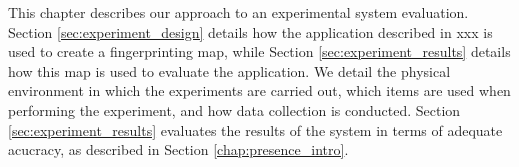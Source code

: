 This chapter describes our approach to an experimental system evaluation.
Section \ref{sec:experiment_design} details how the application described in xxx is used to create a fingerprinting map, while Section \ref{sec:experiment_results} details how this map is used to evaluate the application.
We detail the physical environment in which the experiments are carried out, which items are used when performing the experiment, and how data collection is conducted.
Section \ref{sec:experiment_results} evaluates the results of the system in terms of adequate acucracy, as described in Section \ref{chap:presence_intro}. 